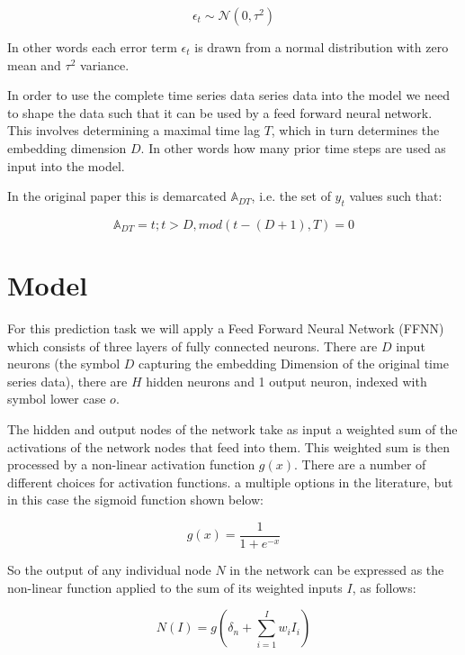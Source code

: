 \documentclass[12pt,a4paper]{article}
\numberwithin{equation}{section}
\begin{document}
\begin{equation}
\epsilon_t \sim \mathcal{N}(0, \tau^2)
\end{equation}

In other words each error term $\epsilon_t$ is drawn from a normal distribution with zero mean
and $\tau^2$ variance.

In order to use the complete time series data series data into the model we need to shape the data
such that it can be used by a feed forward neural network. This involves determining a maximal time
lag $T$, which in turn determines the embedding dimension $D$. In other words how many prior time
steps are used as input into the model.

In the original paper this is demarcated $\mathbb{A}_{DT}$, i.e. the set of $y_t$ values such that:

\begin{equation}
\mathbb{A}_{DT} = {t; t>D, mod(t-(D+1), T)=0 }
\end{equation}


\section{Model}

For this prediction task we will apply a Feed Forward Neural Network (FFNN) which consists 
of three layers of fully connected neurons. There are $D$ input neurons (the symbol $D$ capturing the 
embedding Dimension of the original time series data), there are $H$ hidden neurons and 1 
output neuron, indexed with symbol lower case $o$.

The hidden and output nodes of the network take as input a weighted sum of the activations of
the network nodes that feed into them. This weighted sum is then processed by a non-linear activation
function $g(x)$. There are a number of different choices for activation functions.  
a multiple options in the literature, but in this case the sigmoid function shown below:

\begin{equation}
g(x) = \frac{1}{1 + e^{-x}}
\end{equation}

So the output of any individual node $N$ in the network can be expressed as the non-linear function
applied to the sum of its weighted inputs $I$, as follows:

\begin{equation}
N(I) = g( \delta_n + \sum_{i=1}^I w_i I_i )
\end{equation}
\end{document}
